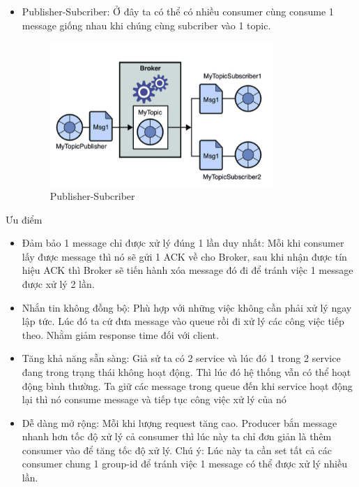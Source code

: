 \begin{itemize}
\begin{itemize}
                \item Publisher-Subcriber: Ở đây ta có thể có nhiều consumer cùng consume 1 message giống nhau khi chúng cùng subcriber vào 1 topic.
                
                \begin{figure}[!ht]   			\includegraphics[width=0.8\textwidth]{Images/PS.png}
        		\centering
        		\linebreak
        		\caption{Publisher-Subcriber}
                \end{figure}
                
            \end{itemize}
            
            Ưu điểm
            
            \begin{itemize}
                \item Đảm bảo 1 message chỉ được xử lý đúng 1 lần duy nhất: Mỗi khi consumer lấy được message thì nó sẽ gửi 1 ACK về cho Broker, sau khi nhận được tín hiệu ACK thì Broker sẽ tiến hành xóa message đó đi để tránh việc 1 message được xử lý 2 lần.
                \item Nhắn tin không đồng bộ: Phù hợp với những việc không cần phải xử lý ngay lập tức. Lúc đó ta cứ đưa message vào queue rồi đi xử lý các công việc tiếp theo. Nhằm giảm response time đối với client.
                \item Tăng khả năng sẵn sàng: Giả sử ta có 2 service và lúc đó 1 trong 2 service đang trong trạng thái không hoạt động. Thì lúc đó hệ thống vẫn có thể hoạt động bình thường. Ta giữ các message trong queue đến khi service hoạt động lại thì nó consume message và tiếp tục công việc xử lý của nó
                \item Dễ dàng mở rộng: Mỗi khi lượng request tăng cao. Producer bắn message nhanh hơn tốc độ xử lý cả consumer thì lúc này ta chỉ đơn giản là thêm consumer vào để tăng tốc độ xử lý. Chú ý: Lúc này ta cần set tất cả các consumer chung 1 group-id để tránh việc 1 message có thể được xử lý nhiều lần.
            \end{itemize}
            

\end{itemize}

